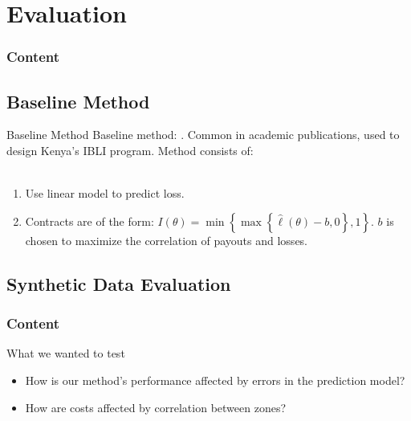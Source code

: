 \documentclass{beamer}
\begin{document}
\section{Evaluation}
\begin{frame}
    \frametitle{Content}
\end{frame}
\subsection{Baseline Method}\label{baseline}
\begin{frame}{Baseline Method}
    Baseline method: \cite{chantarat2013designing}. Common in academic publications, used to design Kenya's IBLI program. Method consists of: 
    \\~~\\
    \begin{enumerate}
        \setlength\itemsep{1em}
        \item Use linear model to predict loss.
        \item Contracts are of the form: $I(\theta) = \min \left \{\max \left \{\hat{\ell}(\theta) - b,0 \right \}, 1 \right \}$. $b$ is chosen to maximize the correlation of payouts and losses. 
    \end{enumerate}
\end{frame}

\subsection{Synthetic Data Evaluation}
\begin{frame}
    \frametitle{Content}
\end{frame}

\begin{frame}{What we wanted to test}
    \begin{itemize}
        \setlength\itemsep{2em}
        \item How is our method's performance affected by errors in the prediction model?
        \item How are costs affected by correlation between zones?
    \end{itemize}
\end{frame}
\end{document}
